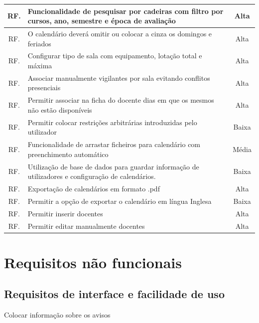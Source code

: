 \documentclass[11pt, twoside]{report}
\begin{document}
\begin{center}
\begin{tabularx}{\textwidth}{|c|X|c|}
				\hline
				RF.  & Funcionalidade de pesquisar por cadeiras com filtro por cursos, ano, semestre e época de avaliação  & Alta \\
				\hline
				RF. & O calendário deverá omitir ou colocar a cinza os domingos e feriados & Alta \\
				\hline
				RF. & Configurar tipo de sala com equipamento, lotação total e máxima & Alta \\
				\hline
				RF. & Associar manualmente vigilantes por sala evitando conflitos presenciais & Alta \\
				\hline
				RF. & Permitir associar na ficha do docente dias em que os mesmos não estão disponíveis & Alta\\
				\hline
				RF. & Permitir colocar restrições arbitrárias introduzidas pelo utilizador & Baixa \\
				\hline
				RF.  & Funcionalidade de arrastar ficheiros para calendário com preenchimento automático & Média \\
				\hline
				RF. & Utilização de base de dados para guardar informação de utilizadores e configuração de calendários. & Baixa \\
				\hline
				RF. & Exportação de calendários em formato .pdf & Alta \\
				\hline
				RF. & Permitir a opção de exportar o calendário em língua Inglesa & Baixa \\
				\hline
				RF. & Permitir inserir docentes &Alta\\
				\hline
				RF. & Permitir editar manualmente docentes & Alta\\
				\hline
			\end{tabularx}

	\end{center}

	
	\section{Requisitos não funcionais}
	\subsection{Requisitos de interface e facilidade de uso}
	
	Colocar informação sobre os avisos
	
\end{document}
